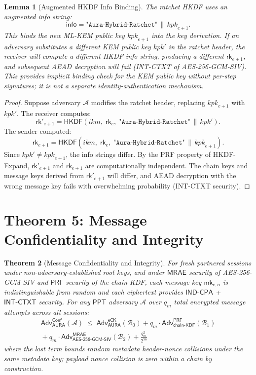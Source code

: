 \documentclass[11pt,a4paper]{article}
\newtheorem{theorem}{Theorem}[section]
\newtheorem{lemma}[theorem]{Lemma}
\theoremstyle{definition}
\theoremstyle{remark}
\newcommand{\ppt}{\mathsf{PPT}}
\newcommand{\adv}{\mathsf{Adv}}
\newcommand{\advA}{\mathcal{A}}
\newcommand{\advB}{\mathcal{B}}
\newcommand{\HKDF}{\mathsf{HKDF}}
\newcommand{\AEAD}{\mathsf{AES\text{-}256\text{-}GCM\text{-}SIV}}
\newcommand{\INDCPA}{\mathsf{IND\text{-}CPA}}
\newcommand{\INTCTXT}{\mathsf{INT\text{-}CTXT}}
\newcommand{\MRAE}{\mathsf{MRAE}}
\newcommand{\PRF}{\mathsf{PRF}}
\newcommand{\eCK}{\mathsf{eCK}}
\newcommand{\rk}{\mathsf{rk}}
\newcommand{\mk}{\mathsf{mk}}
\newcommand{\concat}{\,\|\,}
\begin{document}
\begin{lemma}[Augmented HKDF Info Binding]
\label{lem:augmented-info}
The ratchet HKDF uses an augmented info string:
\[
  \mathsf{info} = \texttt{"Aura-Hybrid-Ratchet"} \concat \mathit{kpk}_{e+1}.
\]
This binds the new ML-KEM public key $\mathit{kpk}_{e+1}$ into the key
derivation.  If an adversary substitutes a different KEM public key
$\mathit{kpk}'$ in the ratchet header, the receiver will compute a different
HKDF info string, producing a different $\rk_{e+1}$, and subsequent AEAD
decryption will fail (INT-CTXT of AES-256-GCM-SIV).  This provides implicit
binding check for the KEM public key without per-step signatures; it is not a
separate identity-authentication mechanism.
\end{lemma}

\begin{proof}
Suppose adversary $\advA$ modifies the ratchet header, replacing
$\mathit{kpk}_{e+1}$ with $\mathit{kpk}'$.  The receiver computes:
\[
  \rk'_{e+1} = \HKDF(\mathit{ikm},\; \rk_e,\;
    \texttt{"Aura-Hybrid-Ratchet"} \concat \mathit{kpk}').
\]
The sender computed:
\[
  \rk_{e+1} = \HKDF(\mathit{ikm},\; \rk_e,\;
    \texttt{"Aura-Hybrid-Ratchet"} \concat \mathit{kpk}_{e+1}).
\]
Since $\mathit{kpk}' \neq \mathit{kpk}_{e+1}$, the info strings differ.
By the PRF property of HKDF-Expand, $\rk'_{e+1}$ and $\rk_{e+1}$ are
computationally independent.  The chain keys and message keys derived from
$\rk'_{e+1}$ will differ, and AEAD decryption with the wrong message key
fails with overwhelming probability (INT-CTXT security). \qedhere
\end{proof}


\section{Theorem 5: Message Confidentiality and Integrity}
\label{sec:thm5}

\begin{theorem}[Message Confidentiality and Integrity]
\label{thm:conf-int}
For fresh partnered sessions under non-adversary-established root keys, and
under $\MRAE$ security of AES-256-GCM-SIV and $\PRF$ security of the
chain KDF, each message key $\mk_{e,n}$ is indistinguishable from random
and each ciphertext provides $\INDCPA$ + $\INTCTXT$ security.
For any $\ppt$ adversary $\advA$ over $q_m$ total encrypted message attempts
across all sessions:
\begin{multline*}
  \adv^{\mathsf{Conf}}_{\mathsf{AURA}}(\advA)
  \;\leq\;
  \adv^{\eCK}_{\mathsf{AURA}}(\advB_0) +
  q_m \cdot \adv^{\PRF}_{\mathsf{chain\text{-}KDF}}(\advB_1) \\
  {} + q_m \cdot \adv^{\MRAE}_{\AEAD}(\advB_2) +
  \frac{q_m^2}{2^{96}}
\end{multline*}
where the last term bounds random metadata header-nonce collisions under the
same metadata key; payload nonce collision is zero within a chain by
construction.
\end{theorem}
\end{document}
